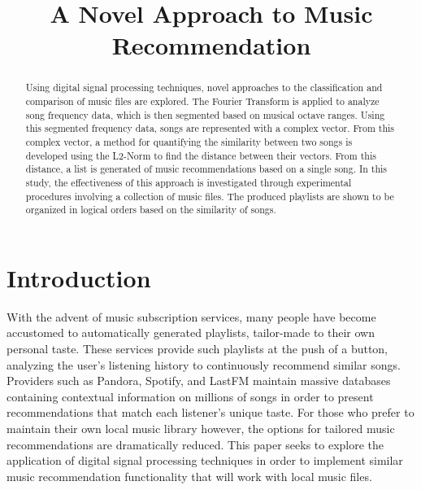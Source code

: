 \documentclass[conference]{IEEEtran}
\begin{document}
\title{A Novel Approach to Music Recommendation}
\author{
  \and
  \and
  }

\maketitle
\begin{abstract}
Using digital signal processing techniques, novel approaches to the classification and comparison of music files are explored. The Fourier Transform is applied to analyze song frequency data, which is then segmented based on musical octave ranges. Using this segmented frequency data, songs are represented with a complex vector. From this complex vector, a method for quantifying the similarity between two songs is developed using the L2-Norm to find the distance between their vectors. From this distance, a list is generated of music recommendations based on a single song. In this study, the effectiveness of this approach is investigated through experimental procedures involving a collection of music files. The produced playlists are shown to be organized in logical orders based on the similarity of songs.
\end{abstract}

\section{Introduction}\label{sec:Introduction}
With the advent of music subscription services, many people have become accustomed to automatically generated playlists, tailor-made to their own personal taste. These services provide such playlists at the push of a button, analyzing the user's listening history to continuously recommend similar songs. Providers such as Pandora, Spotify, and LastFM maintain massive databases containing contextual information on millions of songs in order to present recommendations that match each listener's unique taste. For those who prefer to maintain their own local music library however, the options for tailored music recommendations are dramatically reduced. This paper seeks to explore the application of digital signal processing techniques in order to implement similar music recommendation functionality that will work with local music files.
\end{document}
